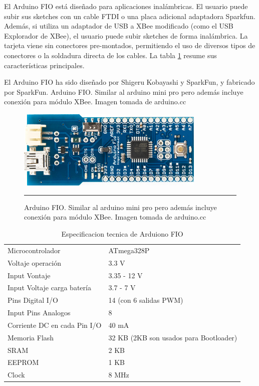 El Arduino FIO está diseñado para aplicaciones inalámbricas. El usuario puede subir sus sketches con un cable FTDI o una placa adicional adaptadora Sparkfun. Además, si utiliza un adaptador de USB a XBee modificado (como el USB Explorador de XBee), el usuario puede subir sketches de forma inalámbrica. La tarjeta viene sin conectores pre-montados, permitiendo el uso de diversos tipos de conectores o la soldadura directa de los cables. La tabla \ref{table:Especificaciones Fio} resume sus características principales.

El Arduino FIO ha sido diseñado por Shigeru Kobayashi y SparkFun, y fabricado por SparkFun.
Arduino FIO. Similar al arduino mini pro pero además incluye conexión para módulo XBee. Imagen tomada de arduino.cc

\begin{figure}[htbp]
	\centering
		\includegraphics[width=0.8\textwidth]{./Figures/MODI/fio.jpg}
		\rule{35em}{0.5pt}
	\caption[fio]{Arduino FIO. Similar al arduino mini pro pero además incluye conexión para módulo XBee. Imagen tomada de arduino.cc}
	\label{fig:fio}
\end{figure}

\begin{table}
    \begin{tabular}{l|l}
    Microcontrolador             & ATmega328P                             \\
    Voltaje operación            & 3.3 V                                  \\
    Input Vontaje                & 3.35 - 12 V                            \\
    Input Voltaje carga batería  & 3.7 - 7 V                              \\
    Pins Digital I/O             & 14 (con 6  salidas PWM)                \\
    Input Pins Analogos          & 8                                      \\
    Corriente DC en cada Pin I/O & 40 mA                                  \\
    Memoria Flash                & 32 KB (2KB son usados para Bootloader) \\
    SRAM                         & 2 KB                                   \\
    EEPROM                       & 1 KB                                   \\
    Clock                        & 8 MHz                                  \\
    \end{tabular}
    \caption[Especificaciones Fio]{Especificacion tecnica de Arduiono FIO}
	\label{table:Especificaciones Fio}
\end{table}

